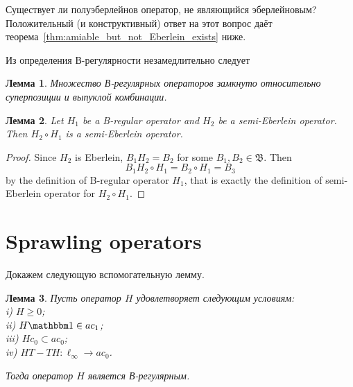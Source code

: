 \documentclass[a4paper,14pt]{article} %
\newcommand{\N}{\ensuremath{\mathbb{N}}}
\newcommand{\B}{\ensuremath{\mathfrak{B}}}
\newcommand{\one}{\ensuremath{\mathbbm 1}}
\theoremstyle{plain}
\newtheorem{lemma}{Лемма}[section]
\begin{document}
Существует ли полуэберлейнов оператор, не являющийся эберлейновым?
Положительный (и конструктивный) ответ на этот вопрос даёт теорема~\ref{thm:amiable_but_not_Eberlein_exists} ниже.



Из определения В-регулярности незамедлительно следует

\begin{lemma}
	\label{lem:B-regular_superposition_and_addition}
	Множество В-регулярных операторов замкнуто относительно суперпозиции и выпуклой комбинации.
\end{lemma}

\begin{lemma}
	Let $H_1$ be a B-regular operator and $H_2$ be a semi-Eberlein operator.
	Then $H_2 \circ H_1$ is a semi-Eberlein operator.
\end{lemma}
\begin{proof}
	Since $H_2$ is Eberlein, $B_1H_2 = B_2$ for some $B_1,B_2\in\B$.
	Then
	\begin{equation}
		B_1 H_2 \circ H_1 = B_2 \circ H_1 = B_3
	\end{equation}
	by the definition of B-regular operator $H_1$,
	that is exactly the definition of semi-Eberlein operator for $H_2 \circ H_1$.
\end{proof}



\section{Sprawling operators}



	Докажем следующую вспомогательную лемму.

	\begin{lemma}
		\label{lem:suff_B_reg}
		Пусть оператор $H$ удовлетворяет следующим условиям:
		\\i)   $H \geq 0$;
		\\ii)  $H\one\in ac_1$;
		\\iii) $H c_0 \subset ac_0$;
		\\iv)  $HT-TH : \ell_\infty \to ac_0$.%

		Тогда оператор $H$ является В-регулярным.
	\end{lemma}
\end{document}
